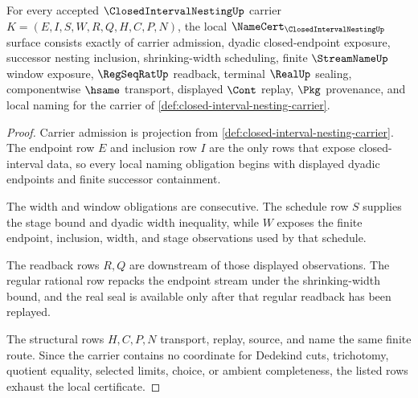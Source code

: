 \begin{theorem}
\label{thm:closed-interval-nesting-namecert-obligations}
For every accepted $\ClosedIntervalNestingUp$ carrier $K=(E,I,S,W,R,Q,H,C,P,N)$, the local $\NameCert_{\ClosedIntervalNestingUp}$ surface consists exactly of carrier admission, dyadic closed-endpoint exposure, successor nesting inclusion, shrinking-width scheduling, finite $\StreamNameUp$ window exposure, $\RegSeqRatUp$ readback, terminal $\RealUp$ sealing, componentwise $\hsame$ transport, displayed $\Cont$ replay, $\Pkg$ provenance, and local naming for the carrier of \autoref{def:closed-interval-nesting-carrier}.
\end{theorem}
\begin{proof}
Carrier admission is projection from \autoref{def:closed-interval-nesting-carrier}. The endpoint row $E$ and inclusion row $I$ are the only rows that expose closed-interval data, so every local naming obligation begins with displayed dyadic endpoints and finite successor containment.

The width and window obligations are consecutive. The schedule row $S$ supplies the stage bound and dyadic width inequality, while $W$ exposes the finite endpoint, inclusion, width, and stage observations used by that schedule.

The readback rows $R,Q$ are downstream of those displayed observations. The regular rational row repacks the endpoint stream under the shrinking-width bound, and the real seal is available only after that regular readback has been replayed.

The structural rows $H,C,P,N$ transport, replay, source, and name the same finite route. Since the carrier contains no coordinate for Dedekind cuts, trichotomy, quotient equality, selected limits, choice, or ambient completeness, the listed rows exhaust the local certificate.
\end{proof}

